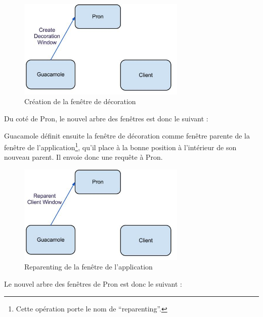 \begin{figure}[H]
  \centering
  \includegraphics[width=8cm]{images/Guacamole_anim_4.jpg}
  \caption{Création de la fenêtre de décoration}
  \label{fig:guacamole_anim_4}
\end{figure}

Du coté de Pron, le nouvel arbre des fenêtres est donc le suivant :

\begin{center}
\end{center}

Guacamole définit ensuite la fenêtre de décoration comme fenêtre parente de la fenêtre de l'application\footnote{Cette opération porte le nom de ``reparenting''.}, qu'il place à la bonne position à l'intérieur de son nouveau parent.
Il envoie donc une requête à Pron.

\begin{figure}[H]
  \centering
  \includegraphics[width=8cm]{images/Guacamole_anim_5.jpg}
  \caption{Reparenting de la fenêtre de l'application}
  \label{fig:guacamole_anim_5}
\end{figure}

Le nouvel arbre des fenêtres de Pron est donc le suivant :

